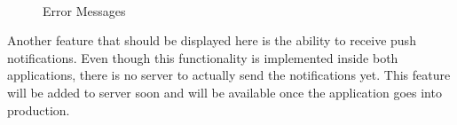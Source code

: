 \begin{figure}[H]
        \myfloatalign
         \quad
         \\
        \caption[Error Messages]{Error Messages}
\end{figure}

Another feature that should be displayed here is the ability to receive push notifications. Even though this functionality is implemented inside both applications, there is no server to actually send the notifications yet. This feature will be added to server soon and will be available once the application goes into production.





 

 